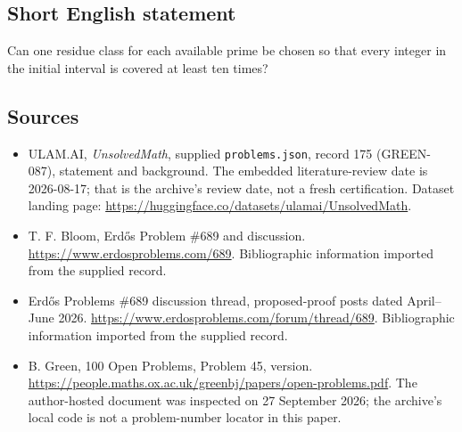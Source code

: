 \documentclass[11pt,a4paper]{article}
\begin{document}
\subsection{Short English statement}

Can one residue class for each available prime be chosen so that every integer in the initial interval is covered at least ten times?

\subsection{Sources}

{\small

\begin{itemize}

\item[\hypertarget{source:175:1}{S1}] ULAM.AI, \emph{UnsolvedMath}, supplied \texttt{problems.json}, record 175 (GREEN-087), statement and background. The embedded literature-review date is 2026-08-17; that is the archive’s review date, not a fresh certification. Dataset landing page: \url{https://huggingface.co/datasets/ulamai/UnsolvedMath}.

\item[\hypertarget{source:175:2}{S2}] T. F. Bloom, Erdős Problem \#689 and discussion. \url{https://www.erdosproblems.com/689}. Bibliographic information imported from the supplied record.

\item[\hypertarget{source:175:3}{S3}] Erdős Problems \#689 discussion thread, proposed-proof posts dated April--June 2026. \url{https://www.erdosproblems.com/forum/thread/689}. Bibliographic information imported from the supplied record.

\item[\hypertarget{source:175:4}{S4}] B. Green, 100 Open Problems, Problem 45, version. \url{https://people.maths.ox.ac.uk/greenbj/papers/open-problems.pdf}. The author-hosted document was inspected on 27 September 2026; the archive’s local code is not a problem-number locator in this paper.

\end{itemize}

}

\label{end:175}
\end{document}
